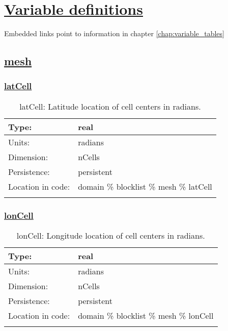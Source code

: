 \chapter[Variable definitions]{\hyperref[chap:variable_tables]{Variable definitions}}
\label{chap:variable_sections}
Embedded links point to information in chapter \ref{chap:variable_tables}
\section[mesh]{\hyperref[sec:var_tab_mesh]{mesh}}
\label{sec:var_sec_mesh}
\subsection[latCell]{\hyperref[sec:var_tab_mesh]{latCell}}
\label{subsec:var_sec_mesh_latCell}
\begin{center}
\begin{longtable}{| p{2.0in} | p{4.0in} |}
        \hline 
        Type: & real \\
        \hline 
        Units: & \si{radians} \\
        \hline 
        Dimension: & nCells \\
        \hline 
        Persistence: & persistent \\
        \hline 
         Location in code: & domain \% blocklist \% mesh \% latCell \\
         \hline 
    \caption{latCell: Latitude location of cell centers in radians.}
\end{longtable}
\end{center}
\subsection[lonCell]{\hyperref[sec:var_tab_mesh]{lonCell}}
\label{subsec:var_sec_mesh_lonCell}
\begin{center}
\begin{longtable}{| p{2.0in} | p{4.0in} |}
        \hline 
        Type: & real \\
        \hline 
        Units: & \si{radians} \\
        \hline 
        Dimension: & nCells \\
        \hline 
        Persistence: & persistent \\
        \hline 
         Location in code: & domain \% blocklist \% mesh \% lonCell \\
         \hline 
    \caption{lonCell: Longitude location of cell centers in radians.}
\end{longtable}
\end{center}
